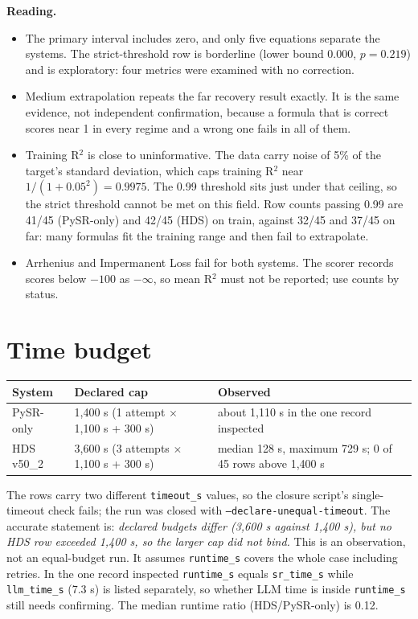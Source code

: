 \documentclass[11pt,a4paper]{article}
\newcommand{\code}[1]{\texttt{#1}}
\begin{document}
\textbf{Reading.}
\begin{itemize}
\item The primary interval includes zero, and only five equations separate the systems. The strict-threshold row is borderline (lower bound 0.000, $p=0.219$) and is exploratory: four metrics were examined with no correction.
\item Medium extrapolation repeats the far recovery result exactly. It is the same evidence, not independent confirmation, because a formula that is correct scores near 1 in every regime and a wrong one fails in all of them.
\item Training R$^2$ is close to uninformative. The data carry noise of 5\% of the target's standard deviation, which caps training R$^2$ near $1/(1+0.05^2)=0.9975$. The 0.99 threshold sits just under that ceiling, so the strict threshold cannot be met on this field. Row counts passing 0.99 are 41/45 (PySR-only) and 42/45 (HDS) on train, against 32/45 and 37/45 on far: many formulas fit the training range and then fail to extrapolate.
\item Arrhenius and Impermanent Loss fail for both systems. The scorer records scores below $-100$ as $-\infty$, so mean R$^2$ must not be reported; use counts by status.
\end{itemize}

\section{Time budget}
\begin{table}[ht]
\centering\small
\begin{tabularx}{\textwidth}{@{}l X X@{}}
\toprule
System & Declared cap & Observed \\
\midrule
PySR-only & 1,400 s (1 attempt $\times$ 1,100 s + 300 s) & about 1,110 s in the one record inspected \\
HDS v50\_2 & 3,600 s (3 attempts $\times$ 1,100 s + 300 s) & median 128 s, maximum 729 s; 0 of 45 rows above 1,400 s \\
\bottomrule
\end{tabularx}
\end{table}

The rows carry two different \code{timeout\_s} values, so the closure script's single-timeout check fails; the run was closed with \code{--declare-unequal-timeout}. The accurate statement is: \emph{declared budgets differ (3,600 s against 1,400 s), but no HDS row exceeded 1,400 s, so the larger cap did not bind.} This is an observation, not an equal-budget run. It assumes \code{runtime\_s} covers the whole case including retries. In the one record inspected \code{runtime\_s} equals \code{sr\_time\_s} while \code{llm\_time\_s} (7.3 s) is listed separately, so whether LLM time is inside \code{runtime\_s} still needs confirming. The median runtime ratio (HDS/PySR-only) is 0.12.
\end{document}
